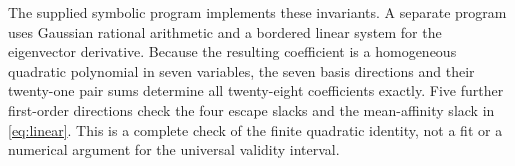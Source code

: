 \documentclass[11pt,a4paper]{article}
\begin{document}
The supplied symbolic program implements these invariants. A separate
program uses Gaussian rational arithmetic and a bordered linear system
for the eigenvector derivative. Because the resulting coefficient is a
homogeneous quadratic polynomial in seven variables, the seven basis
directions and their twenty-one pair sums determine all twenty-eight
coefficients exactly. Five further first-order directions check the four
escape slacks and the mean-affinity slack in \eqref{eq:linear}.
This is a complete check of the finite quadratic identity, not a fit or
a numerical argument for the universal validity interval.



\end{document}
